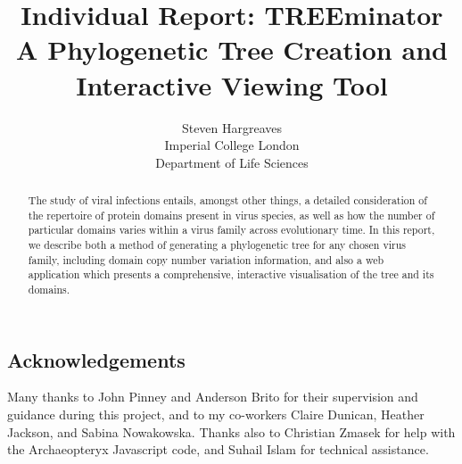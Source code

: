 \documentclass[12pt,a4paper]{article}
\begin{document}
{\selectfont}
\title{\Huge Individual Report: TREEminator\\ \LARGE  A Phylogenetic Tree Creation and Interactive Viewing Tool\vspace{12cm}}
\date{}

\author{\Large Steven Hargreaves\\\vspace{0.5cm}
		\normalsize Imperial College London \\
       	\normalsize Department of Life Sciences}


\maketitle
\newpage
\begin{abstract}
\doublespacing
The study of viral infections entails, amongst other things, a detailed consideration of the repertoire of protein domains present in virus species, as well as how the number of particular domains varies within a virus family across evolutionary time. In this report, we describe both a method of generating a phylogenetic tree for any chosen virus family, including domain copy number variation information, and also a web application which presents a comprehensive, interactive visualisation of the tree and its domains.
\end{abstract}

\newpage
\begin{center}
\section*{Acknowledgements}
\doublespacing
Many thanks to John Pinney and Anderson Brito for their supervision and guidance during this project, and to my co-workers Claire Dunican, Heather Jackson, and Sabina Nowakowska. Thanks also to Christian Zmasek for help with the Archaeopteryx Javascript code, and Suhail Islam for technical assistance.
\end{center}
\newpage
\tableofcontents
\newpage
\end{document}
